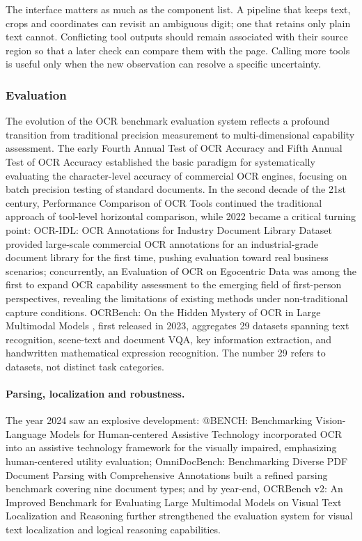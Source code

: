 The interface matters as much as the component list. A pipeline that keeps text, crops and coordinates can revisit an ambiguous digit; one that retains only plain text cannot. Conflicting tool outputs should remain associated with their source region so that a later check can compare them with the page. Calling more tools is useful only when the new observation can resolve a specific uncertainty.

\subsubsection{Evaluation}
The evolution of the OCR benchmark evaluation system reflects a profound transition from traditional precision measurement to multi-dimensional capability assessment. The early Fourth Annual Test of OCR Accuracy \cite{rice1994fourth} and Fifth Annual Test of OCR Accuracy \cite{rice1995fifth} established the basic paradigm for systematically evaluating the character-level accuracy of commercial OCR engines, focusing on batch precision testing of standard documents. In the second decade of the 21st century, Performance Comparison of OCR Tools \cite{patel2012performance} continued the traditional approach of tool-level horizontal comparison, while 2022 became a critical turning point: OCR-IDL: OCR Annotations for Industry Document Library Dataset \cite{ocridl2022} provided large-scale commercial OCR annotations for an industrial-grade document library for the first time, pushing evaluation toward real business scenarios; concurrently, an Evaluation of OCR on Egocentric Data \cite{egocentric2022} was among the first to expand OCR capability assessment to the emerging field of first-person perspectives, revealing the limitations of existing methods under non-traditional capture conditions. OCRBench: On the Hidden Mystery of OCR in Large Multimodal Models \cite{ocrbench2023}, first released in 2023, aggregates 29 datasets spanning text recognition, scene-text and document VQA, key information extraction, and handwritten mathematical expression recognition. The number 29 refers to datasets, not distinct task categories.

\paragraph{Parsing, localization and robustness.}
The year 2024 saw an explosive development: @BENCH: Benchmarking Vision-Language Models for Human-centered Assistive Technology \cite{atbench2024} incorporated OCR into an assistive technology framework for the visually impaired, emphasizing human-centered utility evaluation; OmniDocBench: Benchmarking Diverse PDF Document Parsing with Comprehensive Annotations \cite{omnidocbench2024} built a refined parsing benchmark covering nine document types; and by year-end, OCRBench v2: An Improved Benchmark for Evaluating Large Multimodal Models on Visual Text Localization and Reasoning \cite{ocrbenchv2_2024} further strengthened the evaluation system for visual text localization and logical reasoning capabilities.

